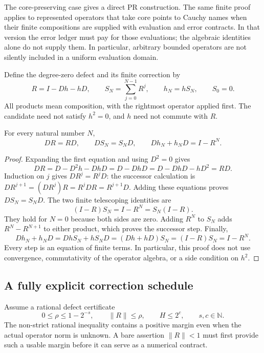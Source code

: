 The core-preserving case gives a direct PR construction.  The same finite
proof applies to represented operators that take core points to Cauchy
names when their finite compositions are supplied with evaluation and error
contracts.  In that version the error ledger must pay for those evaluations;
the algebraic identities alone do not supply them.  In particular, arbitrary
bounded operators are not silently included in a uniform evaluation domain.

Define the degree-zero defect and its finite correction by
\begin{equation}
 R=I-Dh-hD,\qquad
 S_N=\sum_{j=0}^{N-1}R^j,\qquad h_N=hS_N,\qquad S_0=0.
 \label{eq:chain-defect}
\end{equation}
All products mean composition, with the rightmost operator applied first.
The candidate need not satisfy $h^2=0$, and $h$ need not commute with $R$.

\begin{lemma}
\label{lem:finite-chain-correction}
For every natural number $N$,
\begin{equation}
 DR=RD,\qquad DS_N=S_ND,\qquad
                Dh_N+h_ND=I-R^N.
 \label{eq:chain-finite-identity}
\end{equation}
\end{lemma}
\begin{proof}
Expanding the first equation and using $D^2=0$ gives
\[
 DR=D-D^2h-DhD=D-DhD
    =D-DhD-hD^2=RD.
\]
Induction on $j$ gives $DR^j=R^jD$: the successor calculation is
$DR^{j+1}=(DR^j)R=R^jDR=R^{j+1}D$.
Adding these equations proves $DS_N=S_ND$.  The two finite telescoping
identities are
\[
 (I-R)S_N=I-R^N=S_N(I-R).
\]
They hold for $N=0$ because both sides are zero.  Adding $R^N$ to $S_N$
adds $R^N-R^{N+1}$ to either product, which proves the successor step.
Finally,
\[
 Dh_N+h_ND
   =DhS_N+hS_ND
   =(Dh+hD)S_N
   =(I-R)S_N=I-R^N.
\]
Every step is an equation of finite terms.  In particular, this proof does
not use convergence, commutativity of the operator algebra, or a side
condition on $h^2$.
\end{proof}

\subsection{A fully explicit correction schedule}

Assume a rational defect certificate
\begin{equation}
      0\le\rho\le 1-2^{-s},\qquad
      \|R\|\le\rho,\qquad H\le 2^c,
      \qquad s,c\in\mathbb N.
 \label{eq:chain-margin}
\end{equation}
The non-strict rational inequality contains a positive margin even when the
actual operator norm is unknown.  A bare assertion $\|R\|<1$ must first
provide such a usable margin before it can serve as a numerical contract.

